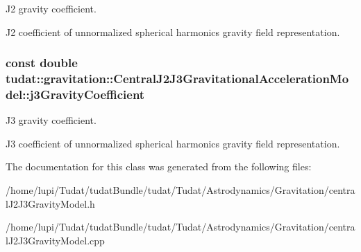 J2 gravity coefficient. 

J2 coefficient of unnormalized spherical harmonics gravity field representation. 
\subsubsection[{\texorpdfstring{j3\+Gravity\+Coefficient}{j3GravityCoefficient}}]{\setlength{\rightskip}{0pt plus 5cm}const double tudat\+::gravitation\+::\+Central\+J2\+J3\+Gravitational\+Acceleration\+Model\+::j3\+Gravity\+Coefficient\hspace{0.3cm}{\ttfamily [protected]}}\hypertarget{classtudat_1_1gravitation_1_1CentralJ2J3GravitationalAccelerationModel_a5b382c2c9adea0e0f46e46bb44f242f2}{}\label{classtudat_1_1gravitation_1_1CentralJ2J3GravitationalAccelerationModel_a5b382c2c9adea0e0f46e46bb44f242f2}


J3 gravity coefficient. 

J3 coefficient of unnormalized spherical harmonics gravity field representation. 

The documentation for this class was generated from the following files\+:\begin{DoxyCompactItemize}
\item 
/home/lupi/\+Tudat/tudat\+Bundle/tudat/\+Tudat/\+Astrodynamics/\+Gravitation/central\+J2\+J3\+Gravity\+Model.\+h\item 
/home/lupi/\+Tudat/tudat\+Bundle/tudat/\+Tudat/\+Astrodynamics/\+Gravitation/central\+J2\+J3\+Gravity\+Model.\+cpp\end{DoxyCompactItemize}
